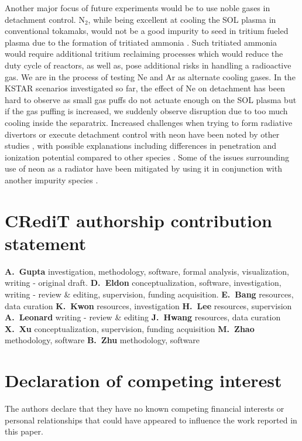 \documentclass[10pt]{iopart}
\begin{document}
Another major focus of future experiments would be to use noble gases in detachment control.
N$_2$, while being excellent at cooling the SOL plasma in conventional tokamaks, would not be a good impurity to seed in tritium fueled plasma due to the formation of tritiated ammonia \cite{Pitts_2019_NME}.
Such tritiated ammonia would require additional tritium reclaiming processes which would reduce the duty cycle of reactors, as well as, pose additional risks in handling a radioactive gas.
We are in the process of testing Ne and Ar as alternate cooling gases.
In the KSTAR scenarios investigated so far, the effect of Ne on detachment has been hard to observe as small gas puffs do not actuate enough on the \ac{SOL} plasma but if the gas puffing is increased, we suddenly observe disruption due to too much cooling inside the separatrix.
Increased challenges when trying to form radiative divertors or execute detachment control with neon have been noted by other studies \cite{eldon_2025_ppcf}, with possible explanations including differences in penetration and ionization potential compared to other species \cite{casali_2020_pop,casali_2022_nf}.
Some of the issues surrounding use of neon as a radiator have been mitigated by using it in conjunction with another impurity species \cite{Eldon_2023_NME}.



\section*{CRediT authorship contribution statement}

\textbf{A.~Gupta} investigation, methodology, software, formal analysis, visualization, writing - original draft.
\textbf{D.~Eldon} conceptualization, software, investigation, writing - review \& editing, supervision, funding acquisition.
\textbf{E.~Bang} resources, data curation
\textbf{K.~Kwon} resources, investigation
\textbf{H.~Lee} resources, supervision
\textbf{A.~Leonard} writing - review \& editing
\textbf{J.~Hwang} resources, data curation
\textbf{X.~Xu} conceptualization, supervision, funding acquisition
\textbf{M.~Zhao} methodology, software
\textbf{B.~Zhu} methodology, software


\section*{Declaration of competing interest}

The authors declare that they have no known competing financial interests or personal relationships that could have appeared to influence the work reported in this paper.
\end{document}

